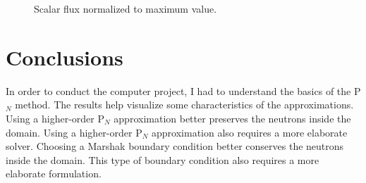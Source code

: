 \documentclass[letterpaper]{article}
\begin{document}
\begin{figure}[h!]
        \centering
        \caption{Scalar flux normalized to maximum value.}
        \label{fig:results}
\end{figure}

\section{Conclusions}
In order to conduct the computer project, I had to understand the basics of the P$_N$ method.
The results help visualize some characteristics of the approximations.
Using a higher-order P$_N$ approximation better preserves the neutrons inside the domain.
Using a higher-order P$_N$ approximation also requires a more elaborate solver.
Choosing a Marshak boundary condition better conserves the neutrons inside the domain.
This type of boundary condition also requires a more elaborate formulation.

\clearpage

% 
\end{document}
